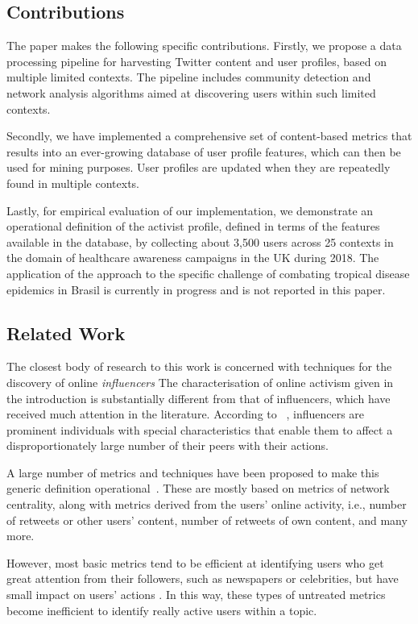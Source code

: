 \documentclass[runningheads]{llncs}
\begin{document}
\subsection{ Contributions}
The paper makes the following specific contributions.
%
Firstly, we propose a data processing pipeline for harvesting Twitter content and user profiles, based on multiple limited contexts. 
The pipeline includes community detection and network analysis algorithms aimed at discovering users within such limited contexts.

Secondly, we have implemented a comprehensive set of content-based metrics that results into an ever-growing database of user profile features, which can then be used for mining purposes. 
User profiles are updated when they are repeatedly found in multiple contexts.

Lastly, for empirical evaluation of our implementation, we demonstrate an operational definition of the activist profile, defined in terms of the features available in the database, by collecting about 3,500 users  across 25 contexts in the domain of healthcare awareness campaigns in the UK during 2018. 
The application of the approach to the specific challenge of combating tropical disease epidemics in Brasil is currently in progress and is not reported in this paper.

\subsection{Related Work}

The closest body of research to this work is concerned with techniques for the discovery of online \textit{influencers} 
The characterisation of online activism given in the introduction is substantially different from that of influencers, which have received much attention in the literature.
According to ~\cite{Kardara2015}, influencers are prominent individuals with special characteristics that enable them to	affect a disproportionately large number of their peers with their actions.

A large number of metrics and techniques have been proposed to make this generic definition operational~\cite{RIQUELME2016949}. These are mostly based on metrics of network centrality, along with metrics derived from the users' online activity, i.e., number of retweets or other users' content, number of retweets of own content, and many more. 

However, most basic metrics tend to be efficient at identifying users who get great attention from their followers, such as newspapers or celebrities, but have small impact on users' actions \cite{MEEYOUNG2010}. In this way, these types of untreated metrics become inefficient to identify really active users within a topic.
\end{document}
